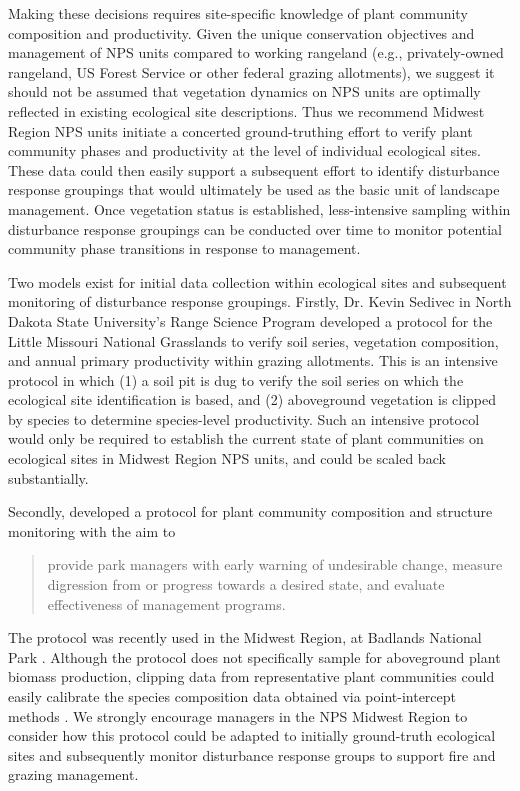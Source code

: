 Making these decisions requires site-specific knowledge of plant community composition and productivity. 
Given the unique conservation objectives and management of NPS units compared to working rangeland (e.g., privately-owned rangeland, US Forest Service or other federal grazing allotments), we suggest it should not be assumed that vegetation dynamics on NPS units are optimally reflected in existing ecological site descriptions. 
Thus we recommend Midwest Region NPS units initiate a concerted ground-truthing effort to verify plant community phases and productivity at the level of individual ecological sites.
These data could then easily support a subsequent effort to identify disturbance response groupings \citep[as per][]{stringham2016} that would ultimately be used as the basic unit of landscape management.
Once vegetation status is established, less-intensive sampling within disturbance response groupings can be conducted over time to monitor potential community phase transitions in response to management. 

Two models exist for initial data collection within ecological sites and subsequent monitoring of disturbance response groupings. 
Firstly, Dr. Kevin Sedivec in North Dakota State University's Range Science Program developed a protocol for the Little Missouri National Grasslands to verify soil series, vegetation composition, and annual primary productivity within grazing allotments. 
This is an intensive protocol in which (1) a soil pit is dug to verify the soil series on which the ecological site identification is based, and (2) aboveground vegetation is clipped by species to determine species-level productivity. 
Such an intensive protocol would only be required to establish the current state of plant communities on ecological sites in Midwest Region NPS units, and could be scaled back substantially. 

Secondly, \citet{symstad2012} developed a protocol for plant community composition and structure monitoring with the aim to

\begin{quote}
	provide park managers with early warning of undesirable change, measure digression from or progress towards a desired state, and evaluate effectiveness of management programs.
\end{quote}

The protocol was recently used in the Midwest Region, at Badlands National Park \citep{ashton2019}. 
Although the protocol does not specifically sample for aboveground plant biomass production, clipping data from representative plant communities could easily calibrate the species composition data obtained via point-intercept methods \citep{yurkonis2012}.
We strongly encourage managers in the NPS Midwest Region to consider how this protocol could be adapted to initially ground-truth ecological sites and subsequently monitor disturbance response groups to support fire and grazing management. 

